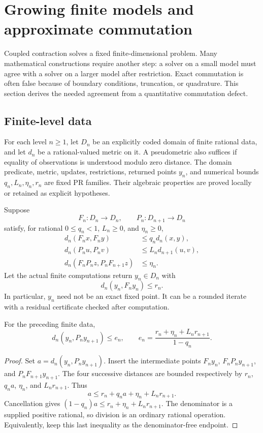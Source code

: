 \section{Growing finite models and approximate commutation}
\label{sec:refinement}

Coupled contraction solves a fixed finite-dimensional problem. Many
mathematical constructions require another step: a solver on a small
model must agree with a solver on a larger model after restriction.
Exact commutation is often false because of boundary conditions,
truncation, or quadrature. This section derives the needed agreement
from a quantitative commutation defect.

\subsection{Finite-level data}

For each level \(n\ge1\), let \(D_n\) be an explicitly coded domain of
finite rational data, and let \(d_n\) be a rational-valued metric on it.
A pseudometric also suffices if equality of observations is understood
modulo zero distance. The domain predicate, metric, updates, restrictions, returned points
\(y_n\), and numerical bounds \(q_n,L_n,\eta_n,r_n\) are fixed PR families. Their algebraic properties are
proved locally or retained as explicit hypotheses.

Suppose
\[
 F_n:D_n\longrightarrow D_n,\qquad
 P_n:D_{n+1}\longrightarrow D_n
\]
satisfy, for rational \(0\le q_n<1\), \(L_n\ge0\), and
\(\eta_n\ge0\),
\begin{align}
 d_n(F_nx,F_ny)&\le q_n d_n(x,y),
                                    \label{eq:level-contraction}\\
 d_n(P_nu,P_nv)&\le L_n d_{n+1}(u,v),
                                    \label{eq:restriction-lipschitz}\\
 d_n(F_nP_nz,P_nF_{n+1}z)&\le\eta_n.
                                    \label{eq:commutation-defect}
\end{align}
Let the actual finite computations return \(y_n\in D_n\) with
\[
 d_n(y_n,F_ny_n)\le r_n.             \label{eq:level-residual}\tag{R1}
\]
In particular, \(y_n\) need not be an exact fixed point. It can be a
rounded iterate with a residual certificate checked after computation.

\begin{theorem}
\label{thm:commutation}
For the preceding finite data,
\[
 d_n(y_n,P_ny_{n+1})\le e_n,
 \qquad
 e_n=\frac{r_n+\eta_n+L_nr_{n+1}}{1-q_n}.
 \label{eq:adjacent-error}\tag{R2}
\]
\end{theorem}
\begin{proof}
Set \(a=d_n(y_n,P_ny_{n+1})\). Insert the intermediate points
\(F_ny_n\), \(F_nP_ny_{n+1}\), and \(P_nF_{n+1}y_{n+1}\).
The four successive distances are bounded respectively by
\(r_n\), \(q_na\), \(\eta_n\), and \(L_nr_{n+1}\). Thus
\[
 a\le r_n+q_na+\eta_n+L_nr_{n+1}.
\]
Cancellation gives \((1-q_n)a\le r_n+\eta_n+L_nr_{n+1}\).
The denominator is a supplied positive rational, so division is an
ordinary rational operation. Equivalently, keep this last inequality
as the denominator-free endpoint.
\end{proof}

